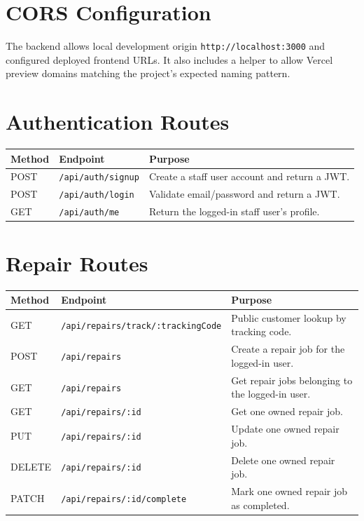 \documentclass[12pt,a4paper]{report}
\begin{document}
\section{CORS Configuration}

The backend allows local development origin \texttt{http://localhost:3000} and configured deployed frontend URLs. It also includes a helper to allow Vercel preview domains matching the project's expected naming pattern.

\section{Authentication Routes}

\begin{longtable}{p{}p{}p{}}
\toprule
\textbf{Method} & \textbf{Endpoint} & \textbf{Purpose}\\
\midrule
POST & \texttt{/api/auth/signup} & Create a staff user account and return a JWT.\\
POST & \texttt{/api/auth/login} & Validate email/password and return a JWT.\\
GET & \texttt{/api/auth/me} & Return the logged-in staff user's profile.\\
\bottomrule
\end{longtable}

\section{Repair Routes}

\begin{longtable}{p{}p{}p{}}
\toprule
\textbf{Method} & \textbf{Endpoint} & \textbf{Purpose}\\
\midrule
GET & \texttt{/api/repairs/track/:trackingCode} & Public customer lookup by tracking code.\\
POST & \texttt{/api/repairs} & Create a repair job for the logged-in user.\\
GET & \texttt{/api/repairs} & Get repair jobs belonging to the logged-in user.\\
GET & \texttt{/api/repairs/:id} & Get one owned repair job.\\
PUT & \texttt{/api/repairs/:id} & Update one owned repair job.\\
DELETE & \texttt{/api/repairs/:id} & Delete one owned repair job.\\
PATCH & \texttt{/api/repairs/:id/complete} & Mark one owned repair job as completed.\\
\bottomrule
\end{longtable}
\end{document}
